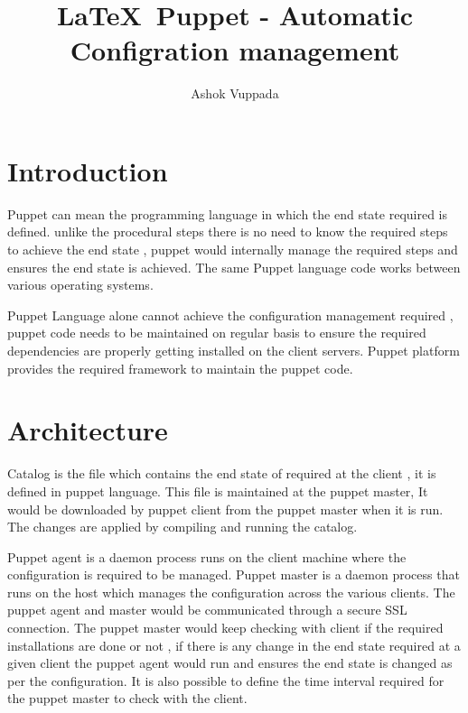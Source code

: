 \documentclass[9pt,twocolumn,twoside]{../../styles/osajnl}
\title{\LaTeX\ Puppet - Automatic Configration management }
\author[1,*]{Ashok Vuppada}
\affil[1]{School of Informatics and Computing, Bloomington, IN 47408, U.S.A.}
\affil[*]{Corresponding authors: ashokmadhu66@gmail.com}
\begin{document}
\maketitle



\section{Introduction}

Puppet can mean the programming language in which the end state
required is defined. unlike the procedural steps there is no need to
know the required steps to achieve the end state , puppet would
internally manage the required steps and ensures the end state is
achieved. The same Puppet language code works between various
operating systems. \cite{www-infoq}

Puppet Language alone cannot achieve the configuration management
required , puppet code needs to be maintained on regular basis to
ensure the required dependencies are properly getting installed on the
client servers. Puppet platform provides the required framework to
maintain the puppet code. \cite{www-infoq}



\section{Architecture}

Catalog is the file which contains the end state of required at the
client , it is defined in puppet language. This file is maintained at
the puppet master, It would be downloaded by puppet client from the
puppet master when it is run. The changes are applied by compiling and
running the catalog.\cite{www-docpuppet}

Puppet agent is a daemon process runs on the client machine where the
configuration is required to be managed. Puppet master is a daemon
process that runs on the host which manages the configuration across
the various clients. The puppet agent and master would be communicated
through a secure SSL connection. The puppet master would keep checking
with client if the required installations are done or not , if there
is any change in the end state required at a given client the puppet
agent would run and ensures the end state is changed as per the
configuration. It is also possible to define the time interval
required for the puppet master to check with the client.\cite{www-slashroot}
\end{document}

